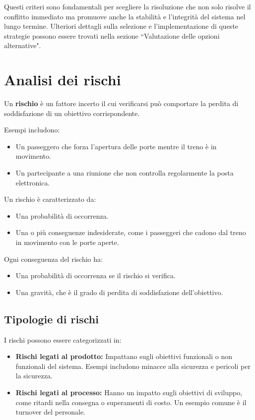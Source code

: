 Questi criteri sono fondamentali per scegliere la risoluzione che non solo risolve
il conflitto immediato ma promuove anche la stabilità e l'integrità del sistema nel
lungo termine. Ulteriori dettagli sulla selezione e l'implementazione di queste
strategie possono essere trovati nella sezione ``Valutazione delle opzioni alternative".

\section{Analisi dei rischi}
\begin{tcolorbox}[colback=blue!5!white,colframe=blue!75!black,title=Rischio]
    Un \textbf{rischio} è un fattore incerto il cui verificarsi può comportare la perdita
di soddisfazione di un obiettivo corrispondente.
\end{tcolorbox}

Esempi includono:
\begin{itemize}
    \item Un passeggero che forza l'apertura delle porte mentre il treno è in movimento.
    \item Un partecipante a una riunione che non controlla regolarmente la posta elettronica.
\end{itemize}
Un rischio è caratterizzato da:
\begin{itemize}
    \item Una probabilità di occorrenza.
    \item Una o più conseguenze indesiderate, come i passeggeri che cadono dal treno in movimento con le porte aperte.
\end{itemize}
Ogni conseguenza del rischio ha:
\begin{itemize}
    \item Una probabilità di occorrenza se il rischio si verifica.
    \item Una gravità, che è il grado di perdita di soddisfazione dell'obiettivo.
\end{itemize}

\subsection{Tipologie di rischi}
I rischi possono essere categorizzati in:
\begin{itemize}
    \item \textbf{Rischi legati al prodotto:} Impattano sugli obiettivi funzionali o non funzionali del sistema. Esempi includono minacce alla sicurezza e pericoli per la sicurezza.
    \item \textbf{Rischi legati al processo:} Hanno un impatto sugli obiettivi di sviluppo, come ritardi nella consegna o superamenti di costo. Un esempio comune è il turnover del personale.
\end{itemize}
